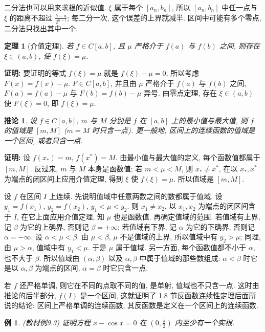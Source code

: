 \documentclass[UTF8,openany]{ctexbook}
\theoremstyle{chinesetextbook}
\newtheorem{example}{例}[section]
\newtheorem{theorem}{定理}[section]
\newenvironment{cnproof}{\par\indent\textbf{证明:} \ignorespaces}{\par}
\newtheorem*{corollarysingle}{推论}
\begin{document}
二分法也可以用来求根的近似值. $\xi$ 属于每个 $[a_n,b_n]$, 所以 $[a_n,b_n]$ 中任一点与 $\xi$ 的距离不超过 $\displaystyle\frac{b-a}{2^{n-1}}$; 每二分一次, 这个误差的上界就减半. 区间中可能有多个零点, 二分法只找出其中一个.
\begin{theorem}[介值定理]
若 $f\in C[a,b]$, 且 $\mu$ 严格介于 $f(a)$ 与 $f(b)$ 之间, 则存在 $\xi\in(a,b)$, 使 $f(\xi)=\mu$.
\end{theorem}
\begin{cnproof}
要证明的等式 $f(\xi)=\mu$ 就是 $f(\xi)-\mu=0$, 所以考虑 $F(x)=f(x)-\mu$. $F\in C[a,b]$, 并且由 $\mu$ 严格介于 $f(a)$ 与 $f(b)$ 之间, $F(a)=f(a)-\mu$ 与 $F(b)=f(b)-\mu$ 异号. 由零点定理, 存在 $\xi\in(a,b)$ 使 $F(\xi)=0$, 即 $f(\xi)=\mu$.
\end{cnproof}
\begin{corollarysingle}
设 $f\in C[a,b]$, $m$ 与 $M$ 分别是 $f$ 在 $[a,b]$ 上的最小值与最大值, 则 $f$ 的值域是 $[m,M]$ ($m=M$ 时只含一点). 更一般地, 区间上的连续函数的值域是一个区间, 或者只含一点.
\end{corollarysingle}
\begin{cnproof}
设 $f(x_*)=m$, $f(x^*)=M$. 由最小值与最大值的定义, 每个函数值都属于 $[m,M]$. 反过来, $m$ 与 $M$ 本身是函数值; 若 $m<\mu<M$, 则 $x_*\ne x^*$, 在以 $x_*,x^*$ 为端点的闭区间上应用介值定理, 得到 $\xi$ 使 $f(\xi)=\mu$. 所以值域是 $[m,M]$.

设 $f$ 在区间 $I$ 上连续. 先说明值域中任意两数之间的数都属于值域. 设 $y_1=f(x_1)$, $y_2=f(x_2)$, $y_1<\mu<y_2$. 则 $x_1\ne x_2$, 以 $x_1,x_2$ 为端点的闭区间含于 $I$, 在它上面应用介值定理, 知 $\mu$ 也是函数值. 再确定值域的范围. 若值域有上界, 记 $\beta$ 为它的上确界, 否则记 $\beta=+\infty$; 若值域有下界, 记 $\alpha$ 为它的下确界, 否则记 $\alpha=-\infty$. 设 $\alpha<\mu<\beta$. 由 $\mu<\beta$, $\mu$ 不是值域的上界, 所以值域中有 $y_2>\mu$; 同理, 由 $\mu>\alpha$, 值域中有 $y_1<\mu$. 于是 $\mu$ 属于值域. 另一方面, 每个函数值都不小于 $\alpha$, 也不大于 $\beta$. 所以值域由 $(\alpha,\beta)$ 以及 $\alpha,\beta$ 中属于值域的那些数组成: $\alpha<\beta$ 时它是以 $\alpha,\beta$ 为端点的区间, $\alpha=\beta$ 时它只含一点.
\end{cnproof}
若 $f$ 还严格单调, 则它在不同的点取不同的值, 是单射, 值域也不只含一点. 这时由推论的后半部分, $f(I)$ 是一个区间, 这就证明了 1.8 节反函数连续性定理后面所说的结论: 区间上严格单调的连续函数, 其反函数是定义在一个区间上的连续函数.
\begin{example}
\textnormal{(教材例9.3)} 证明方程 $x-\cos x=0$ 在 $\displaystyle\left(0,\frac\pi2\right)$ 内至少有一个实根.
\end{example}
\end{document}
